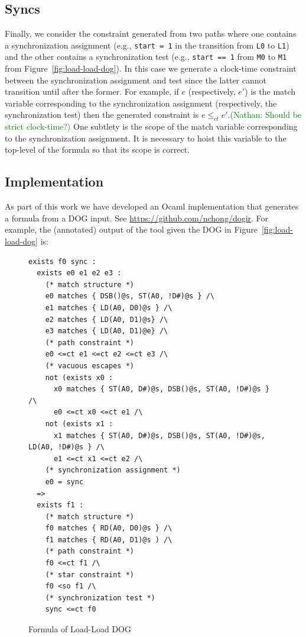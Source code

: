 \documentclass[10pt]{paper}
\newcommand{\state}[1]{\texttt{#1}}
\newcommand{\NCComment}[1]{\textcolor{green}{(Nathan: #1)}}
\begin{document}
\subsection{Syncs}
%
Finally, we consider the constraint generated from two paths where one contains a synchronization assignment (e.g., \texttt{start = 1} in the transition from \state{L0} to \state{L1}) and the other contains a synchronization test (e.g., \texttt{start == 1} from \state{M0} to \state{M1} from Figure~\ref{fig:load-load-dog}).
%
In this case we generate a clock-time constraint between the synchronization assignment and test since the latter cannot transition until after the former.
%
For example, if $e$ (respectively, $e'$) is the match variable corresponding to the synchronization assignment (respectively, the synchronization test) then the generated constraint is $e\leq_{ct} e'$.\NCComment{Should be strict clock-time?}
%
One subtlety is the scope of the match variable corresponding to the synchronization assignment.
%
It is necessary to hoist this variable to the top-level of the formula so that its scope is correct.

\subsection{Implementation}

As part of this work we have developed an Ocaml implementation that generates a formula from a DOG input.
%
See \url{https://github.com/nchong/dogir}.
%
For example, the (annotated) output of the tool given the DOG in Figure~\ref{fig:load-load-dog} is:
%
\begin{figure}[h]
\begin{verbatim}
exists f0 sync :
  exists e0 e1 e2 e3 :
    (* match structure *)
    e0 matches { DSB()@s, ST(A0, !D#)@s } /\
    e1 matches { LD(A0, D0)@s } /\
    e2 matches { LD(A0, D1)@s} /\ 
    e3 matches { LD(A0, D1)@e} /\
    (* path constraint *)
    e0 <=ct e1 <=ct e2 <=ct e3 /\
    (* vacuous escapes *)
    not (exists x0 :
      x0 matches { ST(A0, D#)@s, DSB()@s, ST(A0, !D#)@s } /\
      e0 <=ct x0 <=ct e1 /\
    not (exists x1 :
      x1 matches { ST(A0, D#)@s, DSB()@s, ST(A0, !D#)@s, LD(A0, !D#)@s } /\
      e1 <=ct x1 <=ct e2 /\
    (* synchronization assignment *)
    e0 = sync
  =>
  exists f1 :
    (* match structure *)
    f0 matches { RD(A0, D0)@s } /\ 
    f1 matches { RD(A0, D1)@s ) /\
    (* path constraint *)
    f0 <=ct f1 /\
    (* star constraint *)
    f0 <so f1 /\
    (* synchronization test *)
    sync <=ct f0
\end{verbatim}
\caption{Formula of Load-Load DOG}
\label{fig:load-load-formula}
\end{figure}
\end{document}

